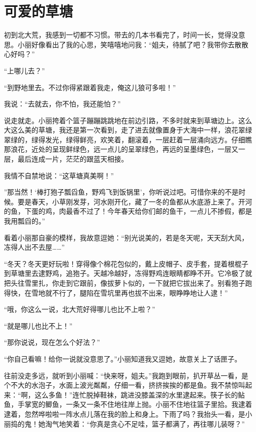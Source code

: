 \documentclass[12pt,UTF-8,openany]{ctexbook}
\begin{document}
\chapter{可爱的草塘}

\begin{large}
    
    初到北大荒，我感到一切都不习惯。带去的几本书看完了，时间一长，觉得没意思。小丽好像看出了我的心思，笑嘻嘻地问我：“姐夫，待腻了吧？我带你去散散心好吗？”
    
    “上哪儿去？”
    
    “到野地里去。不过你得紧跟着我走，俺这儿狼可多啦！”
    
    我说：“去就去，你不怕，我还能怕？”
    
    说走就走。小丽挎着个篮子蹦蹦跳跳地在前边引路，不多时就来到草塘边上。这么大这么美的草塘，我还是第一次看到，走了进去就像置身于大海中一样，浪花翠绿翠绿的，绿得发光，绿得鲜亮，欢笑着，翻滚着，一层赶着一层涌向远方。仔细瞧那浪花，近处的呈现鲜绿色，远一点儿的呈翠绿色，再远的呈墨绿色，一层又一层，最后连成一片，茫茫的跟蓝天相接。
    
    我情不自禁地说：“这草塘真美啊！”
    
    ”那当然！‘棒打狍子瓢舀鱼，野鸡飞到饭锅里’，你听说过吧。可惜你来的不是时候。要是春天，小草刚发芽，河水刚开化，藏了一冬的鱼都从水底游上来了。开河的鱼，下蛋的鸡，肉最香不过了！今年春天给你们邮的鱼干，一点儿不掺假，都是我用瓢舀的。”
    
    看着小丽那自豪的模样，我故意逗她：“别光说美的，若是冬天呢，天天刮大风，冻得人出不去屋……”
    
    “冬天？冬天更好玩啦！穿得像个棉花包似的，戴上皮帽子、皮手套，提着根棍子到草塘里去逮野鸡，追狍子。天越冷越好，冻得野鸡连眼睛都睁不开。它冷极了就把头往雪里扎，你走到它跟前，像拔萝卜似的，一下就把它拔出来了。别看狍子跑得快，在雪地就不行了，腿陷在雪坑里再也拔不出来，眼睁睁地让人逮！”
    
    “哦，你这么一说，北大荒好得哪儿也比不上啦？”
    
    “就是哪儿也比不上！”
    
    “那你说说，现在怎么个好法？”
    
    “你自己看嘛！给你一说就没意思了。”小丽知道我又逗她，故意关上了话匣子。
    
    往前没走多远，就听到小丽喊：“快来呀，姐夫。”我跑到眼前，扒开草丛一看，是个不大的水泡子，水面上波光粼粼，仔细一看，挤挤挨挨的都是鱼。我不禁惊叫起来：“啊，这么多鱼！”连忙脱掉鞋袜，跳进没膝盖深的水里逮起来。筷子长的鲇鱼，手掌宽的鲫鱼，一条又一条不住地往岸上抛。小丽不住地往篮子里拾。我逮着逮着，忽然哗啦啦一阵水点儿落在我的脸上和身上。下雨了吗？我抬头一看，是小丽捣的鬼！她淘气地笑着：“你真是贪心不足哇，篮子都满了，再往哪儿装呀？”
    

\end{large}
\end{document}
